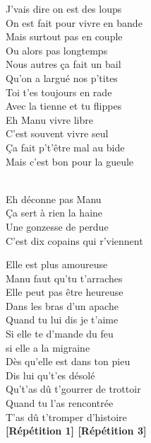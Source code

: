 \documentclass{novel}
\begin{document}
\begin{multicols}{2}
J'vais dire on est des loups \\
On est fait pour vivre en bande \\
Mais surtout pas en couple \\
Ou alors pas longtemps \\
Nous autres ça fait un bail \\
Qu'on a largué nos p'tites \\
Toi t'es toujours en rade \\
Avec la tienne et tu flippes \\
Eh Manu vivre libre \\
C'est souvent vivre seul \\
Ça fait p't'être mal au bide \\
Mais c'est bon pour la gueule \\

\begin{bfseries}
[Répétition 3:]\\
Eh déconne pas Manu \\
Ça sert à rien la haine \\
Une gonzesse de perdue \\
C'est dix copains qui r'viennent \\
\end{bfseries}

Elle est plus amoureuse \\
Manu faut qu'tu t'arraches \\
Elle peut pas être heureuse \\
Dans les bras d'un apache \\
Quand tu lui dis je t'aime \\
Si elle te d'mande du feu \\
si elle a la migraine \\
Dès qu'elle est dans ton pieu \\
Dis lui qu't'es désolé \\
Qu't'as dû t'gourrer de trottoir \\
Quand tu l'as rencontrée \\
T'as dû t'tromper d'histoire \\

\textbf{[Répétition 1] [Répétition 3]}

\end{multicols}
\end{document}
